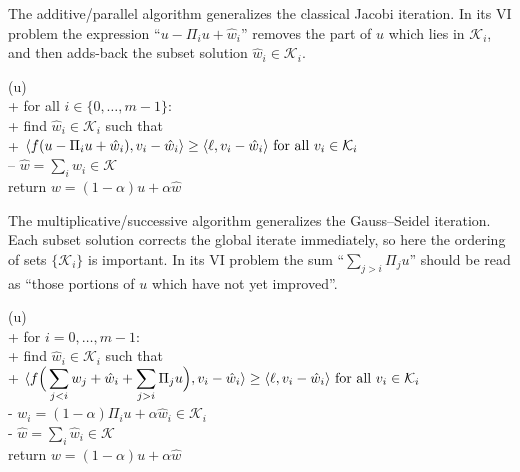 \documentclass[letterpaper,final,12pt,reqno]{amsart}
\theoremstyle{cstyle}
\theoremstyle{cstyle*}
\theoremstyle{dstyle}
\numberwithin{equation}{section}
\numberwithin{figure}{section}
\numberwithin{table}{section}
\numberwithin{theorem}{section}
\newcommand{\cK}{\mathcal{K}}
\newcommand{\cV}{\mathcal{V}}
\newcommand{\ip}[2]{\langle#1,#2\rangle}
\begin{document}
The additive/parallel  algorithm generalizes the classical Jacobi iteration.  In its VI problem the expression ``$u-\Pi_iu+\hat w_i$'' removes the part of $u$ which lies in $\mathcal{K}_i$, and then adds-back the subset solution $\hat w_i \in \mathcal{K}_i$.

\begin{pseudo*}
(u)\text{:} \\+
    for all $i \in \{0,\dots,m-1\}$: \\+
        \rm{find} $\hat w_i\in \cK_i$ \rm{such that} \\+
            $\ip{f(u - \Pi_i u + \hat w_i)}{v_i-\hat w_i} \ge \ip{\ell}{v_i-\hat w_i} \textnormal{ for all } v_i \in \cK_i$ \\--
    $\hat w = \sum_i \hat w_i\in\cK$ \\
    return $w=(1-\alpha) u + \alpha \hat w$
\end{pseudo*}

The multiplicative/successive  algorithm generalizes the Gauss--Seidel iteration.  Each subset solution corrects the global iterate immediately, so here the ordering of sets $\{\cK_i\}$ is important.  In its VI problem the sum ``$\sum_{j>i} \Pi_j u$'' should be read as ``those portions of $u$ which have not yet improved''.

\begin{pseudo*}
(u)\text{:} \\+
    for $i = 0,\dots,m-1$: \\+
        \rm{find} $\hat w_i\in \cK_i$ \rm{such that} \\+
            $\displaystyle \ip{f\Big(\sum_{j<i} w_j + \hat w_i + \sum_{j>i} \Pi_j u\Big)}{v_i-\hat w_i} \ge \ip{\ell}{v_i-\hat w_i} \textnormal{ for all } v_i \in \cK_i$ \\-
            $w_i = (1-\alpha) \Pi_i u + \alpha \hat w_i\in\cK_i$ \\-
    $\hat w = \sum_i \hat w_i\in\cK$ \\
    return $w=(1-\alpha) u + \alpha \hat w$
\end{pseudo*}

\end{document}
